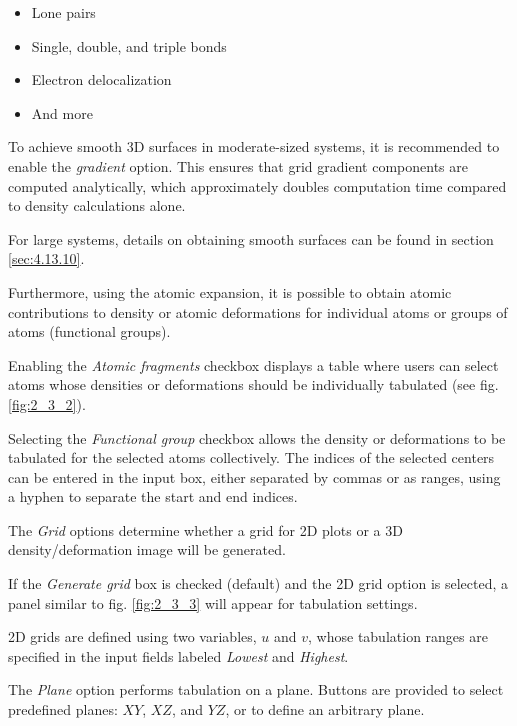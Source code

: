 \documentclass[10pt]{article}
\begin{document}
\begin{itemize}
\item Lone pairs
\item Single, double, and triple bonds
\item Electron delocalization
\item And more
\end{itemize}

To achieve smooth 3D surfaces in moderate-sized systems, it is recommended
to enable the {\it gradient} option.
This ensures that grid gradient components are computed analytically,
which approximately doubles computation time compared to density calculations alone.

For large systems, details on obtaining smooth surfaces
can be found in section \ref{sec:4.13.10}.

Furthermore, using the atomic expansion, it is possible to obtain atomic contributions to density
or atomic deformations for individual atoms or groups of atoms (functional groups).

Enabling the {\it Atomic fragments} checkbox displays a table
where users can select atoms whose densities or deformations
should be individually tabulated (see fig. \ref{fig:2_3_2}).

Selecting the {\it Functional group} checkbox allows the density or deformations
to be tabulated for the selected atoms collectively.
The indices of the selected centers can be entered in the input box,
either separated by commas or as ranges, using a hyphen to separate the start and end indices.

The {\it Grid} options determine whether a grid for 2D plots
or a 3D density/deformation image will be generated.

If the {\it Generate grid} box is checked (default) and the 2D grid option is selected,
a panel similar to fig. \ref{fig:2_3_3} will appear for tabulation settings.

2D grids are defined using two variables, $u$ and $v$,
whose tabulation ranges are specified in the input fields labeled {\it Lowest} and {\it Highest}.

The {\it Plane} option performs tabulation on a plane.
Buttons are provided to select predefined planes: $XY$, $XZ$, and $YZ$,
or to define an arbitrary plane.
\end{document}
